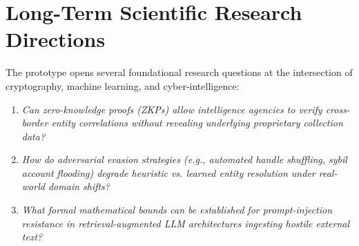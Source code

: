 \section{Long-Term Scientific Research Directions}
\label{sec:future-research}
The prototype opens several foundational research questions at the intersection of cryptography, machine learning, and cyber-intelligence:
\begin{enumerate}
    \item \textit{Can zero-knowledge proofs (ZKPs) allow intelligence agencies to verify cross-border entity correlations without revealing underlying proprietary collection data?}
    \item \textit{How do adversarial evasion strategies (e.g., automated handle shuffling, sybil account flooding) degrade heuristic vs. learned entity resolution under real-world domain shifts?}
    \item \textit{What formal mathematical bounds can be established for prompt-injection resistance in retrieval-augmented LLM architectures ingesting hostile external text?}
\end{enumerate}
